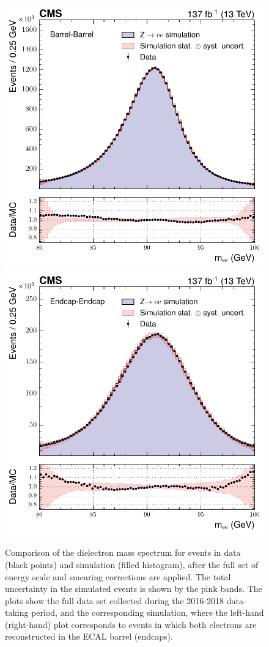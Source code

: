 \begin{figure}[hptb]
  \centering
  \includegraphics[width=.49\textwidth]{Figures/hgg_overview/money_run2_EbEb_inclusive.pdf}
  \includegraphics[width=.49\textwidth]{Figures/hgg_overview/money_run2_EeEe_inclusive.pdf}
  \caption[Dielectron mass spectrum for \Zee events in data and simulation after the energy corrections are applied]
  {
    Comparison of the dielectron mass spectrum for \Zee events in data (black points) and simulation (filled histogram), after the full set of energy scale and smearing corrections are applied. The total uncertainty in the simulated events is shown by the pink bands. The plots show the full data set collected during the 2016-2018 data-taking period, and the corresponding simulation, where the left-hand (right-hand) plot corresponds to events in which both electrons are reconstructed in the ECAL barrel (endcaps).
  }
  \label{fig:photon_energy_0}
\end{figure}

